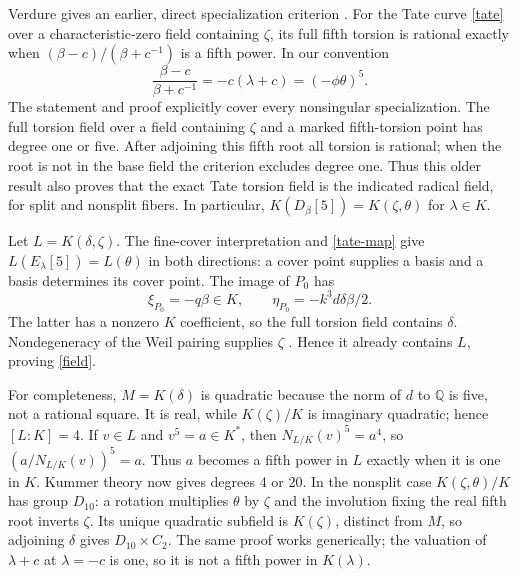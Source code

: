 \documentclass[11pt]{article}
\newcommand{\Q}{\mathbb Q}
\begin{document}
Verdure gives an earlier, direct specialization criterion
\cite[Proposition 3, Corollary 1 and Theorem 5]{verdure}. For the Tate
curve \eqref{tate} over a characteristic-zero field containing $\zeta$,
its full fifth torsion is rational exactly when
$(\beta-c)/(\beta+c^{-1})$ is a fifth power. In our convention
\[
\frac{\beta-c}{\beta+c^{-1}}=-c(\lambda+c)=(-\phi\theta)^5.
\]
The statement and proof explicitly cover every nonsingular
specialization. The full torsion field over a field containing
$\zeta$ and a marked fifth-torsion point has degree one or five.
After adjoining this fifth root all torsion is rational; when the
root is not in the base field the criterion excludes degree one.
Thus this older result also proves that the exact Tate torsion field
is the indicated radical field, for split and nonsplit fibers. In
particular, $K(D_\beta[5])=K(\zeta,\theta)$ for $\lambda\in K$.

Let $L=K(\delta,\zeta)$. The fine-cover interpretation and
\eqref{tate-map} give $L(E_\lambda[5])=L(\theta)$ in both directions:
a cover point supplies a basis and a basis determines its cover point.
The image of $P_0$ has
\[
\xi_{P_0}=-q\beta\in K,\qquad
\eta_{P_0}=-k^3d\delta\beta/2.
\]
The latter has a nonzero $K$ coefficient, so the full torsion field
contains $\delta$. Nondegeneracy of the Weil pairing supplies
$\zeta$ \cite[Theorem 23.29]{pairing}. Hence it already contains $L$,
proving \eqref{field}.

For completeness, $M=K(\delta)$ is quadratic because the norm of $d$
to $\Q$ is five, not a rational square. It is real, while
$K(\zeta)/K$ is imaginary quadratic; hence $[L:K]=4$.
If $v\in L$ and $v^5=a\in K^*$, then
$N_{L/K}(v)^5=a^4$, so $(a/N_{L/K}(v))^5=a$. Thus $a$ becomes a
fifth power in $L$ exactly when it is one in $K$. Kummer theory now
gives degrees 4 or 20. In the nonsplit case $K(\zeta,\theta)/K$ has
group $D_{10}$: a rotation multiplies $\theta$ by $\zeta$ and the
involution fixing the real fifth root inverts $\zeta$. Its unique
quadratic subfield is $K(\zeta)$, distinct from $M$, so adjoining
$\delta$ gives $D_{10}\times C_2$. The same proof works generically;
the valuation of $\lambda+c$ at $\lambda=-c$ is one, so it is not a
fifth power in $K(\lambda)$.
\end{document}

